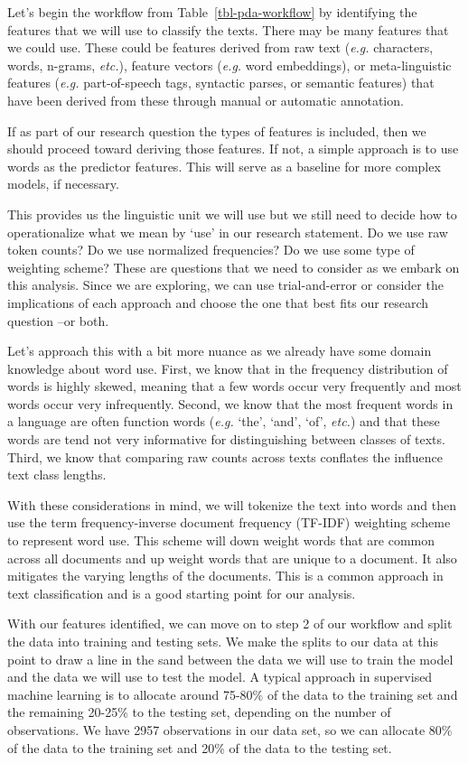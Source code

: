\documentclass[
  letterpaper,
]{latex/krantz}
\theoremstyle{definition}
\theoremstyle{remark}
\begin{document}
Let's begin the workflow from Table~\ref{tbl-pda-workflow} by
identifying the features that we will use to classify the texts. There
may be many features that we could use. These could be features derived
from raw text (\emph{e.g.} characters, words, n-grams, \emph{etc.}),
feature vectors (\emph{e.g.} word embeddings), or meta-linguistic
features (\emph{e.g.} part-of-speech tags, syntactic parses, or semantic
features) that have been derived from these through manual or automatic
annotation.

If as part of our research question the types of features is included,
then we should proceed toward deriving those features. If not, a simple
approach is to use words as the predictor features. This will serve as a
baseline for more complex models, if necessary.

This provides us the linguistic unit we will use but we still need to
decide how to operationalize what we mean by `use' in our research
statement. Do we use raw token counts? Do we use normalized frequencies?
Do we use some type of weighting scheme? These are questions that we
need to consider as we embark on this analysis. Since we are exploring,
we can use trial-and-error or consider the implications of each approach
and choose the one that best fits our research question --or both.

Let's approach this with a bit more nuance as we already have some
domain knowledge about word use. First, we know that in the frequency
distribution of words is highly skewed, meaning that a few words occur
very frequently and most words occur very infrequently. Second, we know
that the most frequent words in a language are often function words
(\emph{e.g.} `the', `and', `of', \emph{etc.}) and that these words are
tend not very informative for distinguishing between classes of texts.
Third, we know that comparing raw counts across texts conflates the
influence text class lengths.

With these considerations in mind, we will tokenize the text into words
and then use the term frequency-inverse document frequency (TF-IDF)
weighting scheme to represent word use. This scheme will down weight
words that are common across all documents and up weight words that are
unique to a document. It also mitigates the varying lengths of the
documents. This is a common approach in text classification and is a
good starting point for our analysis.

With our features identified, we can move on to step 2 of our workflow
and split the data into training and testing sets. We make the splits to
our data at this point to draw a line in the sand between the data we
will use to train the model and the data we will use to test the model.
A typical approach in supervised machine learning is to allocate around
75-80\% of the data to the training set and the remaining 20-25\% to the
testing set, depending on the number of observations. We have 2957
observations in our data set, so we can allocate 80\% of the data to the
training set and 20\% of the data to the testing set.
\end{document}
